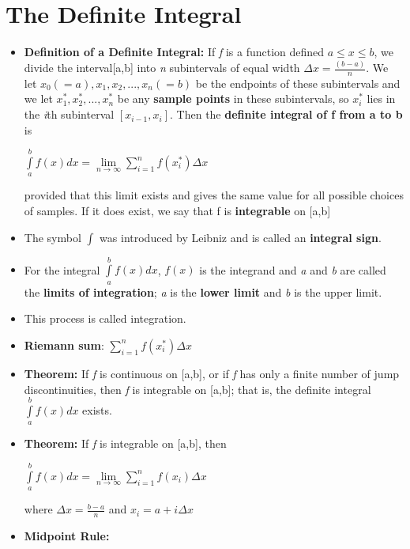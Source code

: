 \documentclass{report}
\begin{document}
		\section{The Definite Integral}
			\begin{itemize}\addtolength{\leftskip}{2em}
				\item \textbf{Definition of a Definite Integral: }If \textit{f} is a function defined $a\le x \le b$, we divide the interval[a,b] into \textit{n} subintervals of equal width $\Delta x=\frac{(b-a)}{n}$. We let $x_0(=a),x_1,x_2,...,x_n(=b)$ be the endpoints of these subintervals and we let $x_1^*,x_2^*,...,x_n^*$ be any \textbf{sample points} in these subintervals, so $x_i^*$ lies in the \textit{i}th subinterval $[x_{i-1},x_i]$. Then the \textbf{definite integral of f from a to b} is 
					\begin{center}
					$\int\limits_{a}^{b}f(x)dx=\lim\limits_{n\rightarrow \infty}\sum\limits_{i=1}^{n}f(x_i^*)\Delta x$
					\end{center}
				provided that this limit exists and gives the same value for all possible choices of samples. If it does exist, we say that f is \textbf{integrable} on [a,b]
				\item The symbol $\int$ was introduced by Leibniz and is called an \textbf{integral sign}.
				\item For the integral $\int\limits_{a}^{b}f(x)dx$, $f(x)$ is the integrand and \textit{a} and \textit{b} are called the \textbf{limits of integration}; \textit{a} is the \textbf{lower limit} and \textit{b} is the upper limit. 
				\item This process is called integration.
				\item \textbf{Riemann sum}: $\sum\limits_{i=1}^{n}f(x_i^*)\Delta x$
				\item \textbf{Theorem:} If \textit{f} is continuous on [a,b], or if \textit{f} has only a finite number of jump discontinuities, then \textit{f} is integrable on [a,b]; that is, the definite integral $\int\limits_{a}^{b}f(x)dx$ exists.
				\item \textbf{Theorem:} If \textit{f} is integrable on [a,b], then 
					\begin{center}
					$\int\limits_{a}^{b}f(x)dx=\lim\limits_{n\rightarrow \infty}\sum\limits_{i=1}^{n}f(x_i)\Delta x$
					\end{center}
					\begin{center}
					where $\Delta x=\frac{b-a}{n}$ and $x_i=a+i\Delta x$
					\end{center}
				\item \textbf{Midpoint Rule:} 

\end{itemize}
\end{document}
